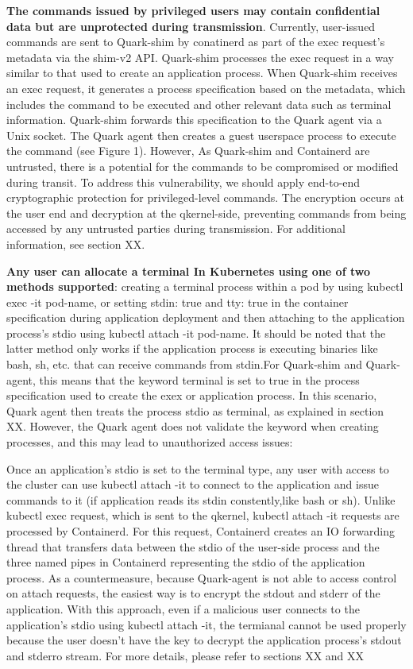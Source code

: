 \textbf{The commands issued by privileged users may contain confidential data but are unprotected during transmission}. Currently, user-issued commands are sent to Quark-shim by conatinerd  as part of the exec request’s metadata via the shim-v2 API\cite*{shim_v2}. Quark-shim processes the exec request in 
a way similar to that used to create an application process. When Quark-shim receives an exec request, it generates a process specification based on the metadata, which includes the command to be executed and other relevant data such as 
terminal information. Quark-shim forwards this specification to the Quark agent via a Unix socket. The Quark agent then creates a guest userspace process to execute the command (see Figure 1). However, As Quark-shim and Containerd are 
untrusted, there is a potential for the commands to be compromised or modified during transit. To address this vulnerability, we should apply end-to-end cryptographic protection for privileged-level commands. The encryption occurs at the user end 
and decryption at the qkernel-side, preventing commands from being accessed by any untrusted parties during transmission. For additional information, see section XX.


\textbf{Any user can allocate a terminal In Kubernetes using one of two methods supported}: creating a terminal process within a pod by using kubectl exec -it pod-name, or setting stdin: true and tty: true in the container specification during 
application deployment and then attaching to the application process’s stdio using kubectl attach -it pod-name. It should be noted that the latter method only works if the application process is executing binaries like bash, sh, etc. that can 
receive commands from stdin.For Quark-shim and Quark-agent, this means that the keyword terminal is set to true in the process specification used to create the exex or application process. In this scenario, Quark agent then treats the process 
stdio as terminal, as explained in section XX. However, the Quark agent does not validate the keyword when creating processes, and this may lead to unauthorized access issues:

Once an application's stdio is set to the terminal type, any user with access to the cluster can use kubectl attach -it to connect to the application and issue commands to it (if application reads its stdin constently,like bash or sh). Unlike 
kubectl exec request, which is sent to the qkernel, kubectl attach -it requests are processed by Containerd. For this request, Containerd creates an IO forwarding thread that transfers data between the stdio of the user-side process and the 
three named pipes in Containerd representing the stdio of the application process. As a countermeasure, because Quark-agent is not able to access control on attach requests, the easiest way is to encrypt the stdout and stderr of the application. 
With this approach, even if a malicious user connects to the application's stdio using kubectl attach -it, the termianal cannot be used properly 
because the user doesn’t have the key to decrypt the application process's stdout and stderro stream. For more details, please refer to sections XX and XX


